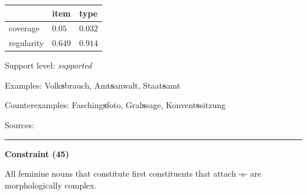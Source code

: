 \vspace{-0.25em}

\begin{table}[!ht]
\begin{center}
\setlength{\extrarowheight}{1pt}
\begin{tabularx}{\columnwidth}{|X|X|X|}
\hline
 & item & type \\
\hline
 coverage & $0.05$ & $0.032$ \\
\hline
 regularity & $0.649$ & $0.914$ \\
\hline
\end{tabularx}
\end{center}
\end{table}

\vspace{-1.35em}

\noindent
Support level: \textit{supported}

\vspace{0.3em}

\noindent
Examples: Volk\textbf{s}brauch, Amt\textbf{s}anwalt, Staat\textbf{s}amt

\noindent
Counterexamples: Fasching\textbf{s}foto, Gral\textbf{s}sage, Konvent\textbf{s}sitzung

\vspace{0.3em}

\noindent
Sources: \citet[25]{kuerschner_2010}

\vspace{0.35em}
\hrule




\vspace{0.4em}

\begin{center}
\textbf{Constraint (45)}
\end{center}

\noindent
All feminine nouns that constitute first constituents that attach -s- are morphologically complex.
\vspace{0.5em}


